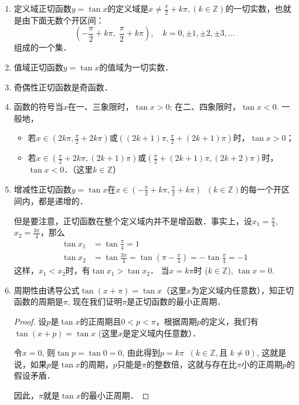 \begin{enumerate}
    \item 定义域\quad  正切函数$y=\tan x$的定义域是$x\ne \frac{\pi}{2}+k\pi, 
(k\in\mathbb{Z})$的一切实数，也就是由下面无数个开区间：
\[\left(-\frac{\pi}{2}+k\pi,\; \frac{\pi}{2}+k\pi\right),\quad k=0,\pm1,\pm2,\pm3,\ldots \]
组成的一个集．
\item 值域\quad  正切函数$y=\tan x$的值域为一切实数．
\item 奇偶性\quad 正切函数是奇函数．
\item 函数的符号\quad 当$x$在一、三象限时，$\tan x>0$; 在二、四象限时，$\tan x<0$. 一般地，
\begin{itemize}
    \item 若$x\in\left(2k\pi,\frac{\pi}{2}+2k\pi\right)$或$\left((2k+1)\pi,\frac{\pi}{2}+(2k+1)\pi\right)$时，$\tan x>0$；
    \item 若$x\in\left(\frac{\pi}{2}+2k\pi,(2k+1)\pi\right)$或$\left(\frac{\pi}{2}+(2k+1)\pi, (2k+2)\pi\right)$时，$\tan x<0$．（这里$k\in\mathbb{Z}$）
\end{itemize}

 \item 增减性\quad 正切函数$y=\tan x$在$x\in\left(-\frac{\pi}{2}+k\pi,\frac{\pi}{2}+k\pi\right)\;\; (k\in\mathbb{Z})$的每一个开区间内，都是递增的．

 但是要注意，正切函数在整个定义域内并不是增函数．事实上，设$x_1=\frac{\pi}{4}$, $x_2=\frac{3\pi}{4}$，那么
 \[\begin{split}
     \tan x_1&=\tan\frac{\pi}{4}=1\\
     \tan x_2&=\tan\frac{3\pi}{4}=\tan\left(\pi-\frac{\pi}{4}\right)=-\tan\frac{\pi}{4}=-1
 \end{split}\]
这样，$x_1<x_2$时，有$\tan x_1>\tan x_2$．
 当$x=k\pi$时 ($k\in\mathbb{Z}$), $\tan x=0$.
 
 \item 周期性\quad 由诱导公式$\tan (x+\pi)=\tan x$（这里$x$为定义域内任意数），知正切函数的周期是$\pi$, 现在我们证明$\pi$是正切函数的最小正周期．
 
\begin{proof}
    设$p$是$\tan x$的正周期且$0<p<\pi$，根据周期$p$的定义，我们有
$\tan (x+p)=\tan x$ (这里$x$是定义域内任意数）．

令$x=0$, 则$\tan p=\tan 0=0$, 由此得到$p=k\pi\;\; (k\in\mathbb{Z}, \text{且 }k\ne 0)$, 这就是说，如果$p$是$\tan x$的周期，$p$只能是$\pi$的整数倍，这就与存在比$\pi$小的正周期$p$的假设矛盾．

因此，$\pi$就是$\tan x$的最小正周期．
\end{proof}


\end{enumerate}
